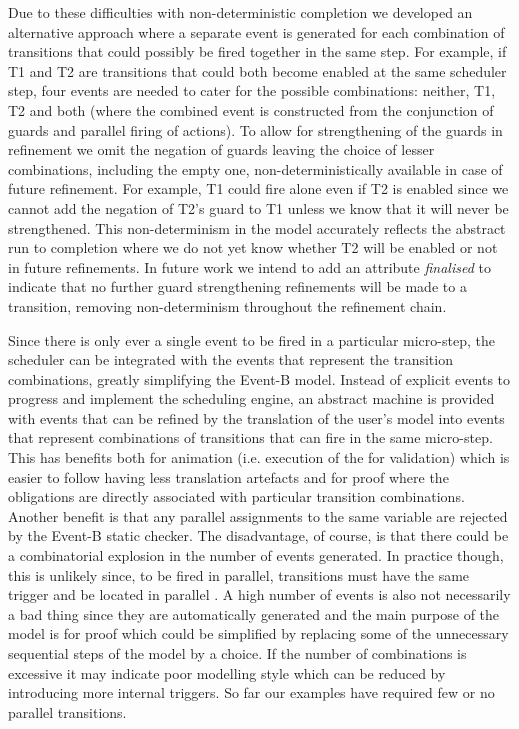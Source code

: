 Due to these difficulties with non-deterministic completion we developed an alternative approach where a separate event is generated for each combination of transitions that could possibly be fired together in the same step. 
For example, if T1 and T2 are transitions that could both become enabled at the same scheduler step, four events are needed to cater for the possible combinations: neither, T1, T2 and both (where the combined event is constructed from the conjunction of guards and parallel firing of actions). 
To allow for strengthening of the guards  in refinement we omit the negation of guards
leaving the choice of lesser combinations, including the empty one, non-deterministically available in case of future refinement.
For example, T1 could fire alone even if T2 is enabled since we cannot add the negation of T2's guard to T1 unless we know that it will never be strengthened. 
This non-determinism in the model accurately reflects the abstract run to completion where we do not yet know whether T2 will be enabled or not in future refinements. 
In future work we intend to add an attribute \emph{finalised} to indicate that no further guard strengthening refinements will be made to a transition, removing non-determinism throughout the refinement chain.

Since there is only ever a single event to be fired in a particular micro-step, the scheduler can be integrated with the events that represent the transition combinations, greatly simplifying the Event-B model.
Instead of explicit events to progress and implement the scheduling engine, an abstract machine is provided with events that can be refined by the translation of the user's \SCXML model into events that represent combinations of transitions that can fire in the same micro-step.
This has benefits both for animation (i.e. execution of the \statechart for validation) which is easier to follow having less translation artefacts and for proof where the obligations are directly associated with particular transition combinations. 
Another benefit is that any parallel assignments to the same variable are rejected by the Event-B static checker.
The disadvantage, of course, is that there could be a combinatorial explosion in the number of events generated.
In practice though, this is unlikely since, to be fired in parallel, transitions must have the same trigger and be located in parallel \statecharts.
A high number of events is also not necessarily a bad thing since they are automatically generated and the main purpose of the \EventB model is for proof which could be simplified by replacing some of the unnecessary sequential steps of the model by a choice.
If the number of combinations is excessive it may indicate poor modelling style which can be reduced by introducing more internal triggers.
So far our examples have required few or no parallel transitions.

